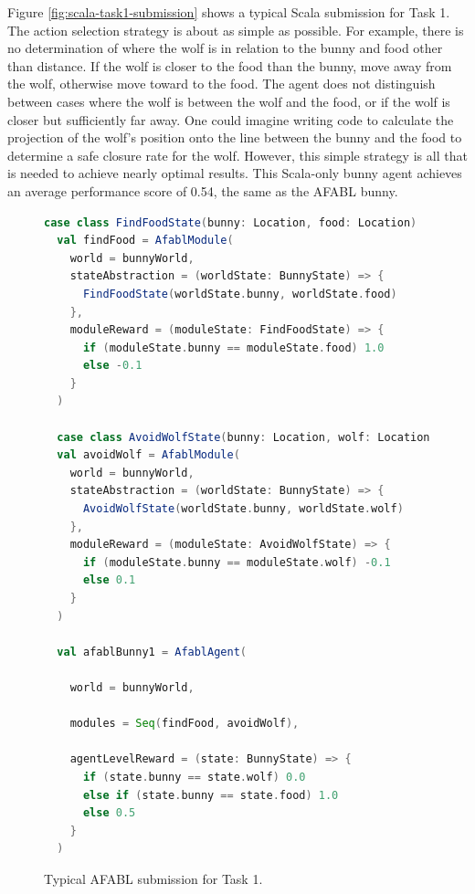 Figure \ref{fig:scala-task1-submission} shows a typical Scala submission for Task 1. The action selection strategy is about as simple as possible. For example, there is no determination of where the wolf is in relation to the bunny and food other than distance. If the wolf is closer to the food than the bunny, move away from the wolf, otherwise move toward to the food. The agent does not distinguish between cases where the wolf is between the wolf and the food, or if the wolf is closer but sufficiently far away. One could imagine writing code to calculate the projection of the wolf's position onto the line between the bunny and the food to determine a safe closure rate for the wolf. However, this simple strategy is all that is needed to achieve nearly optimal results. This Scala-only bunny agent achieves an average performance score of 0.54, the same as the AFABL bunny.

\begin{figure}[!h]
\begin{center}

\begin{lstlisting}[language=Scala]
  case class FindFoodState(bunny: Location, food: Location)
  val findFood = AfablModule(
    world = bunnyWorld,
    stateAbstraction = (worldState: BunnyState) => {
      FindFoodState(worldState.bunny, worldState.food)
    },
    moduleReward = (moduleState: FindFoodState) => {
      if (moduleState.bunny == moduleState.food) 1.0
      else -0.1
    }
  )

  case class AvoidWolfState(bunny: Location, wolf: Location)
  val avoidWolf = AfablModule(
    world = bunnyWorld,
    stateAbstraction = (worldState: BunnyState) => {
      AvoidWolfState(worldState.bunny, worldState.wolf)
    },
    moduleReward = (moduleState: AvoidWolfState) => {
      if (moduleState.bunny == moduleState.wolf) -0.1
      else 0.1
    }
  )

  val afablBunny1 = AfablAgent(

    world = bunnyWorld,

    modules = Seq(findFood, avoidWolf),

    agentLevelReward = (state: BunnyState) => {
      if (state.bunny == state.wolf) 0.0
      else if (state.bunny == state.food) 1.0
      else 0.5
    }
  )
\end{lstlisting}

\caption{Typical AFABL submission for Task 1.}
\end{center}
\label{fig:afabl-task1-submission}
\end{figure}

